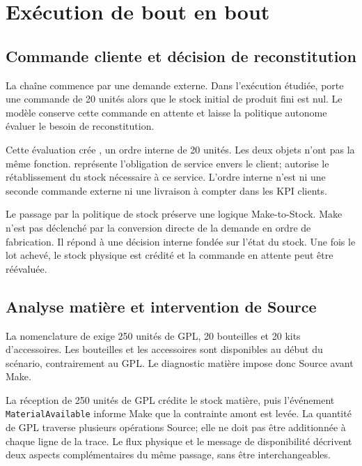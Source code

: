 \chapter{Exécution de bout en bout}
\label{chap:execution-bout-en-bout}

\section{Commande cliente et décision de reconstitution}

La chaîne commence par une demande externe. Dans l'exécution étudiée,  porte une commande de 20 unités alors que le stock initial de produit fini est nul. Le modèle conserve cette commande en attente et laisse la politique autonome évaluer le besoin de reconstitution.

Cette évaluation crée , un ordre interne de 20 unités. Les deux objets n'ont pas la même fonction.  représente l'obligation de service envers le client;  autorise le rétablissement du stock nécessaire à ce service. L'ordre interne n'est ni une seconde commande externe ni une livraison à compter dans les KPI clients.

Le passage par la politique de stock préserve une logique Make-to-Stock. Make n'est pas déclenché par la conversion directe de la demande en ordre de fabrication. Il répond à une décision interne fondée sur l'état du stock. Une fois le lot achevé, le stock physique est crédité et la commande en attente peut être réévaluée.

\section{Analyse matière et intervention de Source}

La nomenclature de  exige 250 unités de GPL, 20 bouteilles et 20 kits d'accessoires. Les bouteilles et les accessoires sont disponibles au début du scénario, contrairement au GPL. Le diagnostic matière impose donc Source avant Make.

La réception de 250 unités de GPL crédite le stock matière, puis l'événement \texttt{MaterialAvailable} informe Make que la contrainte amont est levée. La quantité de GPL traverse plusieurs opérations Source; elle ne doit pas être additionnée à chaque ligne de la trace. Le flux physique et le message de disponibilité décrivent deux aspects complémentaires du même passage, sans être interchangeables.


